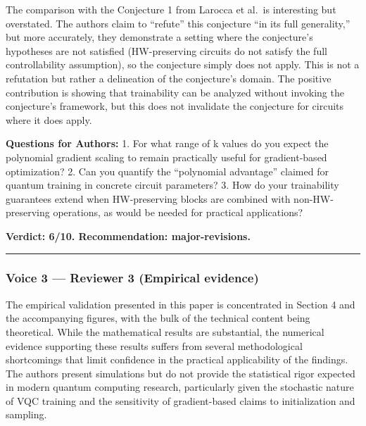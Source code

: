 \documentclass[10pt,letterpaper]{article}
\begin{document}
The comparison with the Conjecture 1 from Larocca et al.~is interesting but overstated. The authors claim to ``refute'' this conjecture ``in its full generality,'' but more accurately, they demonstrate a setting where the conjecture's hypotheses are not satisfied (HW-preserving circuits do not satisfy the full controllability assumption), so the conjecture simply does not apply. This is not a refutation but rather a delineation of the conjecture's domain. The positive contribution is showing that trainability can be analyzed without invoking the conjecture's framework, but this does not invalidate the conjecture for circuits where it does apply.

\textbf{Questions for Authors:}
1. For what range of k values do you expect the polynomial gradient scaling to remain practically useful for gradient-based optimization?
2. Can you quantify the ``polynomial advantage'' claimed for quantum training in concrete circuit parameters?
3. How do your trainability guarantees extend when HW-preserving blocks are combined with non-HW-preserving operations, as would be needed for practical applications?

\textbf{Verdict: 6/10. Recommendation: major-revisions.}

\begin{center}\rule{0.5\linewidth}{0.5pt}\end{center}

\hypertarget{voice-3-reviewer-3-empirical-evidence}{%
\subsubsection{Voice 3 --- Reviewer 3 (Empirical evidence)}\label{voice-3-reviewer-3-empirical-evidence}}

The empirical validation presented in this paper is concentrated in Section 4 and the accompanying figures, with the bulk of the technical content being theoretical. While the mathematical results are substantial, the numerical evidence supporting these results suffers from several methodological shortcomings that limit confidence in the practical applicability of the findings. The authors present simulations but do not provide the statistical rigor expected in modern quantum computing research, particularly given the stochastic nature of VQC training and the sensitivity of gradient-based claims to initialization and sampling.
\end{document}
